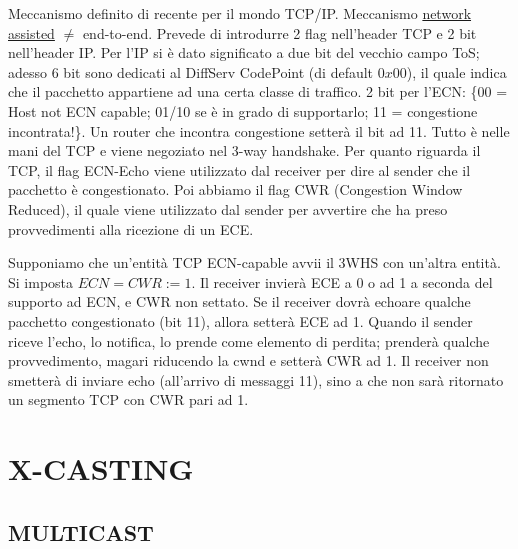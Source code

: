Meccanismo definito di recente per il mondo TCP/IP. Meccanismo \underline{network assisted} $\neq$ end-to-end. Prevede di introdurre 2 flag nell'header TCP e 2 bit nell'header IP. Per l'IP si è dato significato a due bit del vecchio campo ToS; adesso 6 bit sono dedicati al DiffServ CodePoint (di default $0x00$), il quale indica che il pacchetto appartiene ad una certa classe di traffico. 2 bit per l'ECN: \{00 = Host not ECN capable; 01/10 se è in grado di supportarlo; 11 = congestione incontrata!\}. Un router che incontra congestione setterà il bit ad 11. Tutto è nelle mani del TCP e viene negoziato nel 3-way handshake. Per quanto riguarda il TCP, il flag ECN-Echo viene utilizzato dal receiver per dire al sender che il pacchetto è congestionato. Poi abbiamo il flag CWR (Congestion Window Reduced), il quale viene utilizzato dal sender per avvertire che ha preso provvedimenti alla ricezione di un ECE.

Supponiamo che un'entità TCP ECN-capable avvii il 3WHS con un'altra entità. Si imposta $ECN = CWR := 1$. Il receiver invierà ECE a 0 o ad 1 a seconda del supporto ad ECN, e CWR non settato. Se il receiver dovrà echoare qualche pacchetto congestionato (bit 11), allora setterà ECE ad 1. Quando il sender riceve l'echo, lo notifica, lo prende come elemento di perdita; prenderà qualche provvedimento, magari riducendo la cwnd e setterà CWR ad 1. Il receiver non smetterà di inviare echo (all'arrivo di messaggi 11), sino a che non sarà ritornato un segmento TCP con CWR pari ad 1.

\section{X-CASTING} 

\subsection{MULTICAST}

